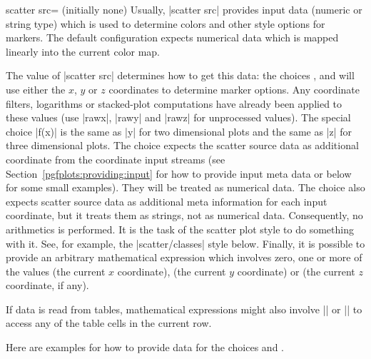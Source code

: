 {\begin{pgfplotskey}{scatter src= (initially none)%
}
    Usually, |scatter src| provides input data (numeric or string type) which
    is used to determine colors and other style options for markers. The
    default configuration expects numerical data which is mapped linearly into
    the current color map.

    The value of |scatter src| determines how to get this data: the choices
    ,  and  will use either the
    $x$, $y$ or $z$ coordinates to determine marker options. Any coordinate
    filters, logarithms or stacked-plot computations have already been applied
    to these values (use |rawx|, |rawy| and |rawz| for unprocessed values). The
    special choice |f(x)| is the same as |y| for two dimensional plots and the
    same as |z| for three dimensional plots. The choice 
    expects the scatter source data as additional coordinate from the
    coordinate input streams (see Section~\ref{pgfplots:providing:input} for
    how to provide input meta data or below for some small examples). They will
    be treated as numerical data. The choice 
    also expects scatter source data as additional meta information for each
    input coordinate, but it treats them as strings,  not as numerical data.
    Consequently, no arithmetics is performed. It is the task of the scatter
    plot style to do something with it. See, for example, the |scatter/classes|
    style below. Finally, it is possible to provide an arbitrary mathematical
    expression which involves zero, one or more of the values 
    (the current $x$ coordinate),  (the current $y$ coordinate)
    or  (the current $z$ coordinate, if any).

    If data is read from tables, mathematical expressions might also involve
    |\thisrow| or |\thisrowno| to access
    any of the table cells in the current row.

    Here are examples for how to provide data for the choices
     and .
\begin{codeexample}
\end{codeexample}
\end{pgfplotskey}}
